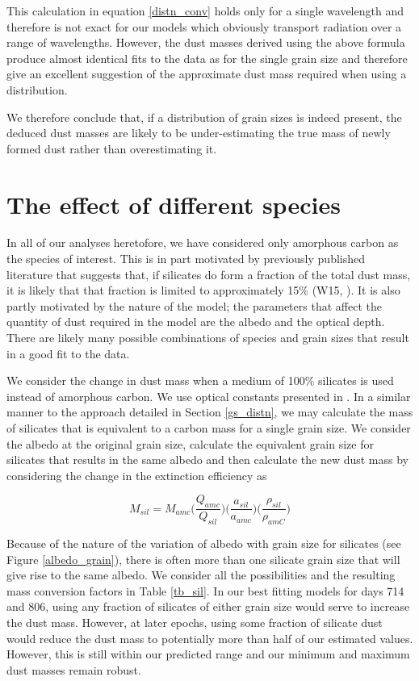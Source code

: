 This calculation in equation \ref{distn_conv} holds only for a single wavelength and therefore is not exact for our models which obviously transport radiation over a range of wavelengths.  However, the dust masses derived using the above formula produce almost identical fits to the data as for the single grain size and therefore give an excellent suggestion of the approximate dust mass required when using a distribution.

We therefore conclude that, if a distribution of grain sizes is indeed present, the deduced dust masses are likely to be under-estimating the true mass of newly formed dust rather than overestimating it.

\section{The effect of different species}

In all of our analyses heretofore, we have considered only amorphous carbon as the species of interest.  This is in part motivated by previously published literature that suggests that, if silicates do form a fraction of the total dust mass, it is likely that that fraction is limited to approximately 15\% (W15, \citet{Ercolano2007}).  It is also partly motivated by the nature of the model; the parameters that affect the quantity of dust required in the model are the albedo and the optical depth.  There are likely many possible combinations of species and grain sizes that result in a good fit to the data.  

We consider the change in dust mass when a medium of 100\% silicates is used instead of amorphous carbon.  We use optical constants presented in \cite{Draine1984}.  In a similar manner to the approach detailed in Section \ref{gs_distn}, we may calculate the mass of silicates that is equivalent to a carbon mass for a single grain size.  We consider the albedo at the original grain size, calculate the equivalent grain size for silicates that results in the same albedo and then calculate the new dust mass by considering the change in the extinction efficiency as

\begin{equation}
M_{sil} = M_{amc} \Big( \frac{Q_{amc}}{Q_{sil}} \Big) \Big(\frac{a_{sil}}{a_{amc}}\Big) \Big(\frac{\rho_{sil}}{\rho_{amC}}\Big)
\end{equation}

Because of the nature of the variation of albedo with grain size for silicates (see Figure \ref{albedo_grain}), there is often more than one silicate grain size that will give rise to the same albedo.  We consider all the possibilities and the resulting mass conversion factors in Table \ref{tb_sil}.  In our best fitting models for days 714 and 806, using any fraction of silicates of either grain size would serve to increase the dust mass.  However, at later epochs, using some fraction of silicate dust would reduce the dust mass to potentially more than half of our estimated values. However, this is still within our predicted range and our minimum and maximum dust masses remain robust.

